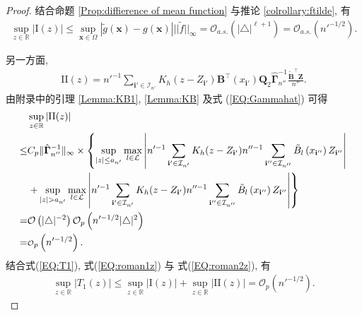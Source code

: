 \documentclass[a4paper,openay,14pt]{ctexbook}
\numberwithin{equation}{section}
\numberwithin{lem}{section}
\begin{document}
\begin{proof}
结合命题 \ref{Prop:diffierence of mean function} 与推论 \ref{colrollary:ftilde}, 有
\begin{align}\label{EQ:roman1z}
    \sup_{z\in\mathbb{R}}|\mathrm{I}(z)|
    \leq
    \sup_{\boldsymbol{x}\in\Omega}
    |\tilde{g}(\boldsymbol{x})-g(\boldsymbol{x})|
    ||\tilde{f}||_{\infty}
    =\mathcal{O}_{a.s.}\left(|\triangle|^{\ell+1}\right)
    =\mathcal{O}_{a.s.}\left(n'^{-1/2}\right).
\end{align}

另一方面,
\begin{align*}
    \mathrm{II}(z)
    =n'^{-1}\sum_{\mathbf{i}'\in\mathcal{I}_{n'}}
      K_h(z-Z_{\mathbf{i}'})
      \mathbf{B}^{\top}(x_{\mathbf{i}'})\mathbf{Q}_2
      \hat{\boldsymbol{\Gamma}}_{n''}^{-1}
      \frac{\tilde{\mathbf{B}}^{\top}\mathbf{Z}}{n''}.
\end{align*}
由附录中的引理 \ref{Lemma:KB1}, \ref{Lemma:KB} 及式 (\ref{EQ:Gammahat}) 可得
\begin{align}\label{EQ:roman2z}
            &\sup_{z\in\mathbb{R}}\left\vert \mathrm{II}(z)\right\vert \\
            \leq &C_p\Vert  \hat{\boldsymbol{\Gamma}}_{n''}^{-1}\Vert_{\infty}\times
            \left\{ \sup_{\vert z\vert\leq a_{n'}}\max_{l\in\mathcal{L}}\left\vert n'^{-1}\sum_{\mathbf{i}'\in\mathcal{I}_{n'}}K_h(z-Z_{\mathbf{i}'})n''^{-1}\sum_{\mathbf{i}''\in\mathcal{I}_{n''}}\tilde{B}_{l}\left(x_{\mathbf{i}''}\right)Z_{\mathbf{i}''}\right\vert\right. \notag \\
             &\left. +\sup_{\vert z\vert > a_{n'}}\max_{l\in\mathcal{L}}\left\vert n'^{-1}\sum_{\mathbf{i}'\in\mathcal{I}_{n'}}K_h(z-Z_{\mathbf{i}'})n''^{-1}\sum_{\mathbf{i}''\in\mathcal{I}_{n''}}\tilde{B}_{l}\left(x_{\mathbf{i}''}\right)Z_{\mathbf{i}''}\right\vert
            \right\} \notag \\
            =&\mathcal{O}\left(\vert\triangle\vert^{-2}\right)\mathcal{O}_p\left(n'^{-1/2}\vert\triangle\vert^{2}\right)\notag\\
            =& {\scriptstyle \mathcal{O}}_p\left(n'^{-1/2}\right).\notag
        \end{align}
结合式(\ref{EQ:T1}), 式(\ref{EQ:roman1z}) 与 式(\ref{EQ:roman2z}), 有
 \begin{align} \label{OUTCOME:T1}
            \sup_{z\in\mathbb{R}} \left\vert T_1(z)\right\vert \leq \sup_{z\in\mathbb{R}}\left\vert \mathrm{I}(z)\right\vert + \sup_{z\in\mathbb{R}}\left\vert \mathrm{II}(z)\right\vert
            ={\scriptstyle \mathcal{O}}_p\left(n'^{-1/2}\right).
        \end{align}


\end{proof}
\end{document}
